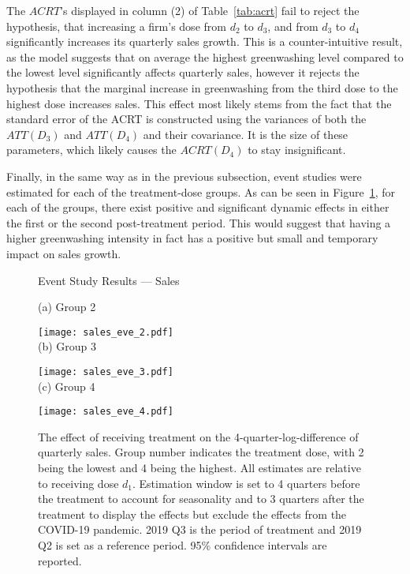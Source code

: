\documentclass[12pt]{article}
\begin{document}
The $ACRT$'s displayed in column (2) of Table~\ref{tab:acrt} fail to reject the hypothesis, that increasing a firm's dose from $d_2$ to $d_3$, and from $d_3$ to $d_4$ significantly increases its quarterly sales growth. This is a counter-intuitive result, as the model suggests that on average the highest greenwashing level compared to the lowest level significantly affects quarterly sales, however it rejects the hypothesis that the marginal increase in greenwashing from the third dose to the highest dose increases sales. This effect most likely stems from the fact that the standard error of the ACRT is constructed using the variances of both the $ATT(D_3)$ and $ATT(D_4)$ and their covariance. It is the size of these parameters, which likely causes the $ACRT(D_4)$ to stay insignificant.

Finally, in the same way as in the previous subsection, event studies were estimated for each of the treatment-dose groups. As can be seen in Figure~\ref{fig:eve_sales}, for each of the groups, there exist positive and significant dynamic effects in either the first or the second post-treatment period. This would suggest that having a higher greenwashing intensity in fact has a positive but small and temporary impact on sales growth.


\begin{figure}
    \caption{Event Study Results --- Sales}\label{fig:eve_sales}
    \centering
    
    (a) Group 2
    
    \texttt{[image: sales\_eve\_2.pdf]} \\
    
    (b) Group 3
    
    \texttt{[image: sales\_eve\_3.pdf]} \\
    
    (c) Group 4
    
    \texttt{[image: sales\_eve\_4.pdf]}
    
    \captionsetup{font=footnotesize}
    \caption*{The effect of receiving treatment on the 4-quarter-log-difference of quarterly sales. Group number indicates the treatment dose, with 2 being the lowest and 4 being the highest. All estimates are relative to receiving dose $d_1$. Estimation window is set to 4 quarters before the treatment to account for seasonality and to 3 quarters after the treatment to display the effects but exclude the effects from the COVID-19 pandemic. 2019 Q3 is the period of treatment and 2019 Q2 is set as a reference period. 95\% confidence intervals are reported.}
\end{figure}
\end{document}
